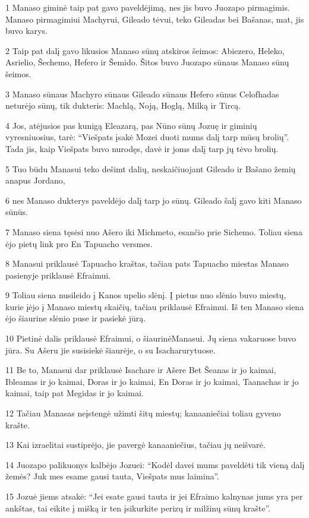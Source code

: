 \par 1 Manaso giminė taip pat gavo paveldėjimą, nes jis buvo Juozapo pirmagimis. Manaso pirmagimiui Machyrui, Gileado tėvui, teko Gileadas bei Bašanas, mat, jis buvo karys. 
\par 2 Taip pat dalį gavo likusios Manaso sūnų atskiros šeimos: Abiezero, Heleko, Asrielio, Šechemo, Hefero ir Šemido. Šitos buvo Juozapo sūnaus Manaso sūnų šeimos. 
\par 3 Manaso sūnaus Machyro sūnaus Gileado sūnaus Hefero sūnus Celofhadas neturėjo sūnų, tik dukteris: Machlą, Noją, Hoglą, Milką ir Tircą. 
\par 4 Jos, atėjusios pas kunigą Eleazarą, pas Nūno sūnų Jozuę ir giminių vyresniuosius, tarė: “Viešpats įsakė Mozei duoti mums dalį tarp mūsų brolių”. Tada jis, kaip Viešpats buvo nurodęs, davė ir joms dalį tarp jų tėvo brolių. 
\par 5 Tuo būdu Manasui teko dešimt dalių, neskaičiuojant Gileado ir Bašano žemių anapus Jordano, 
\par 6 nes Manaso dukterys paveldėjo dalį tarp jo sūnų. Gileado šalį gavo kiti Manaso sūnūs. 
\par 7 Manaso siena tęsėsi nuo Ašero iki Michmeto, esančio prie Sichemo. Toliau siena ėjo pietų link pro En Tapuacho versmes. 
\par 8 Manasui priklausė Tapuacho kraštas, tačiau pats Tapuacho miestas Manaso pasienyje priklausė Efraimui. 
\par 9 Toliau siena nusileido į Kanos upelio slėnį. Į pietus nuo slėnio buvo miestų, kurie įėjo į Manaso miestų skaičių, tačiau priklausė Efraimui. Iš ten Manaso siena ėjo šiaurine slėnio puse ir pasiekė jūrą. 
\par 10 Pietinė dalis priklausė Efraimui, o šiaurinė­Manasui. Jų siena vakaruose buvo jūra. Su Ašeru jie susisiekė šiaurėje, o su Isacharu­rytuose. 
\par 11 Be to, Manasui dar priklausė Isachare ir Ašere Bet Šeanas ir jo kaimai, Ibleamas ir jo kaimai, Doras ir jo kaimai, En Doras ir jo kaimai, Taanachas ir jo kaimai, taip pat Megidas ir jo kaimai. 
\par 12 Tačiau Manasas neįstengė užimti šitų miestų; kanaaniečiai toliau gyveno krašte. 
\par 13 Kai izraelitai sustiprėjo, jie pavergė kanaaniečius, tačiau jų neišvarė. 
\par 14 Juozapo palikuonys kalbėjo Jozuei: “Kodėl davei mums paveldėti tik vieną dalį žemės? Juk mes esame gausi tauta, Viešpats mus laimina”. 
\par 15 Jozuė jiems atsakė: “Jei esate gausi tauta ir jei Efraimo kalnynas jums yra per ankštas, tai eikite į mišką ir ten įsikurkite perizų ir milžinų sūnų krašte”. 
